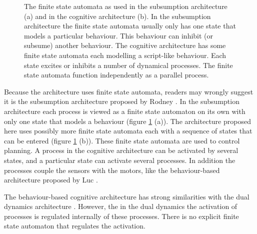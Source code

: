 \begin{figure}[p]
\centering
{}
\caption{The finite state automata as used in the subsumption architecture (a) and in the cognitive architecture (b). In the subsumption architecture the finite state automata usually only has one state that models a particular behaviour. This behaviour can inhibit (or subsume) another behaviour. The cognitive architecture has some finite state automata each modelling a script-like behaviour. Each state excites or inhibits a number of dynamical processes. The finite state automata function independently as a parallel process.}
\label{f:fsa}
\end{figure}

Because the architecture uses finite state automata, readers may wrongly suggest it is the subsumption architecture proposed by Rodney \citet{brooks:1990}. In the subsumption architecture each process is viewed as a finite state automaton on its own with only one state that models a behaviour (figure \ref{f:fsa} (a)). The architecture proposed here uses possibly more finite state automata each with a sequence of states that can be entered (figure \ref{f:fsa} (b)). These finite state automata are used to control planning. A process in the cognitive architecture can be activated by several states, and a particular state can activate several processes. In addition the processes couple the sensors with the motors, like the behaviour-based architecture proposed by Luc \citet{steels:1994b}.




The behaviour-based cognitive architecture has strong similarities with the dual dynamics architecture \citep{jaeger:1997}. However, the in the dual dynamics the activation of processes is regulated internally of these processes. There is no explicit finite state automaton that regulates the activation.

